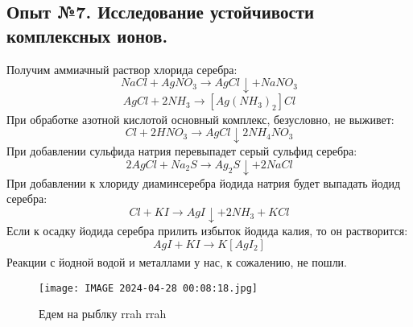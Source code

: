 \documentclass[a4paper,12pt]{article}
\begin{document}
\subsection{Опыт №7. Исследование устойчивости комплексных ионов.}
Получим аммиачный раствор хлорида серебра:
\begin{equation}
    NaCl + AgNO_3 \xrightarrow[]{} AgCl\downarrow + NaNO_3
\end{equation}
\begin{equation}
    AgCl + 2NH_3 \xrightarrow[]{} [Ag(NH_3)_2]Cl
\end{equation}
При обработке азотной кислотой основный комплекс, безусловно, не выживет:
\begin{equation}
    [Ag(NH_3)_2]Cl + 2HNO_3 \xrightarrow[]{} AgCl\downarrow 2NH_4NO_3
\end{equation}
При добавлении сульфида натрия перевыпадет серый сульфид серебра:
\begin{equation}
    2AgCl + Na_2S \xrightarrow[]{} Ag_2S\downarrow + 2NaCl
\end{equation}
При добавлении к хлориду диаминсеребра йодида натрия будет выпадать йодид серебра:
\begin{equation}
    [Ag(NH_3)_2]Cl + KI \xrightarrow[]{} AgI\downarrow + 2NH_3 + KCl
\end{equation}
Если к осадку йодида серебра прилить избыток йодида калия, то он растворится:
\begin{equation}
    AgI + KI \xrightarrow[]{} K[AgI_2]
\end{equation}
Реакции с йодной водой и металлами у нас, к сожалению, не пошли.
\newpage
\begin{figure}[H]
    \centering
    \texttt{[image: IMAGE 2024-04-28 00:08:18.jpg]}
    \caption{Едем на рыблку rrah rrah}
    \label{fig:enter-label}
\end{figure}
\end{document}
